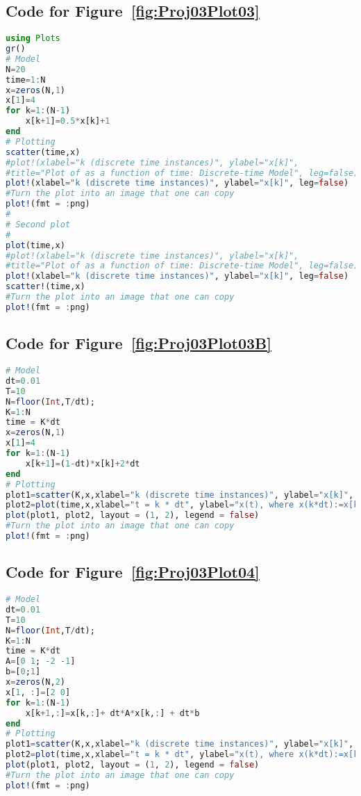 \subsection{Code for Figure~\ref{fig:Proj03Plot03}}
\label{sec:CodeFigs03}

\begin{lstlisting}[language=Julia]
using Plots
gr()
# Model 
N=20
time=1:N
x=zeros(N,1)
x[1]=4
for k=1:(N-1)
    x[k+1]=0.5*x[k]+1
end
# Plotting
scatter(time,x)
#plot!(xlabel="k (discrete time instances)", ylabel="x[k]", 
#title="Plot of as a function of time: Discrete-time Model", leg=false)
plot!(xlabel="k (discrete time instances)", ylabel="x[k]", leg=false)
#Turn the plot into an image that one can copy
plot!(fmt = :png)
#
# Second plot
#
plot(time,x)
#plot!(xlabel="k (discrete time instances)", ylabel="x[k]", 
#title="Plot of as a function of time: Discrete-time Model", leg=false)
plot!(xlabel="k (discrete time instances)", ylabel="x[k]", leg=false)
scatter!(time,x)
#Turn the plot into an image that one can copy
plot!(fmt = :png)  
\end{lstlisting}

\subsection{Code for Figure~\ref{fig:Proj03Plot03B}}
\label{sec:CodeFigs03B}
\begin{lstlisting}[language=Julia]
# Model 
dt=0.01
T=10
N=floor(Int,T/dt);
K=1:N
time = K*dt
x=zeros(N,1)
x[1]=4
for k=1:(N-1)
    x[k+1]=(1-dt)*x[k]+2*dt
end
# Plotting 
plot1=scatter(K,x,xlabel="k (discrete time instances)", ylabel="x[k]", leg=false)
plot2=plot(time,x,xlabel="t = k * dt", ylabel="x(t), where x(k*dt):=x[k]", leg=false)
plot(plot1, plot2, layout = (1, 2), legend = false)
#Turn the plot into an image that one can copy
plot!(fmt = :png)  
\end{lstlisting}

\subsection{Code for Figure~\ref{fig:Proj03Plot04}}
\label{sec:CodeFigs04}



\begin{lstlisting}[language=Julia]
# Model 
dt=0.01
T=10
N=floor(Int,T/dt);
K=1:N
time = K*dt
A=[0 1; -2 -1]
b=[0;1]
x=zeros(N,2)
x[1, :]=[2 0]
for k=1:(N-1)
    x[k+1,:]=x[k,:]+ dt*A*x[k,:] + dt*b
end
# Plotting 
plot1=scatter(K,x,xlabel="k (discrete time instances)", ylabel="x[k]", leg=false)
plot2=plot(time,x,xlabel="t = k * dt", ylabel="x(t), where x(k*dt):=x[k]", leg=false)
plot(plot1, plot2, layout = (1, 2), legend = false)
#Turn the plot into an image that one can copy
plot!(fmt = :png) 
\end{lstlisting}

